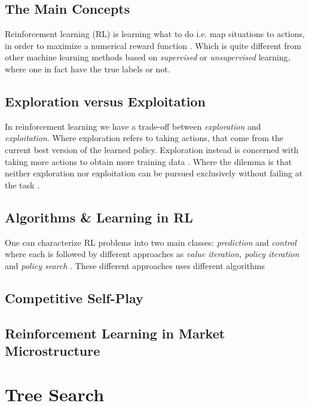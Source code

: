 \documentclass{kththesis}
\theoremstyle{definition}
\begin{document}
\subsection{The Main Concepts}
Reinforcement learning (RL) is learning what to do i.e. map situations to actions, in order to maximize a numerical reward function \parencite{sutton1998reinforcement}. Which is quite different from other machine learning methods based on \textit{supervised} or \textit{unsupervised} learning, where one in fact have the true labels or not.

\subsection{Exploration versus Exploitation}
In reinforcement learning we have a trade-off between \textit{exploration} and \textit{exploitation}. Where exploration refers to taking actions, that come from the current best version of the learned policy. Exploration instead is concerned with taking more actions to obtain more training data \parencite{goodfellow2016deep}. Where the dilemma is that neither exploration nor exploitation can be pursued exclusively without failing at the task \parencite{sutton1998reinforcement}.

\subsection{Algorithms \& Learning in RL}
One can characterize RL problems into two main classes: \textit{prediction} and \textit{control} where each is followed by different approaches as \textit{value iteration, policy iteration} and \textit{policy search} \parencite{szepesvari2009algorithms}. These different approaches uses different algorithms 

\subsection{Competitive Self-Play}

\subsection{Reinforcement Learning in Market Microstructure}


\section{Tree Search}
\end{document}
